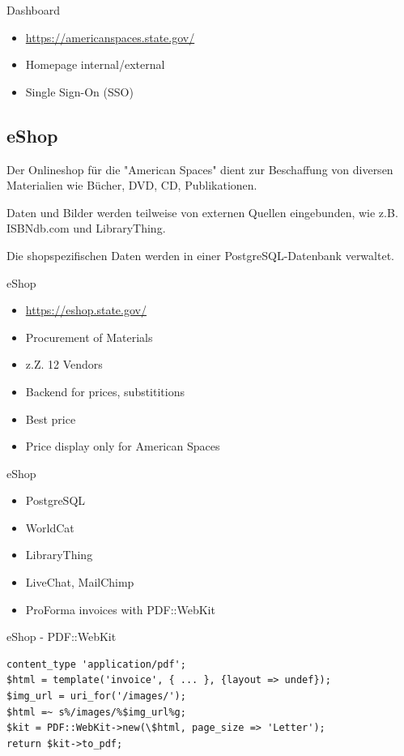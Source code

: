 \begin{frame}{Dashboard}
\begin{itemize}
\item \url{https://americanspaces.state.gov/}
\item Homepage internal/external
\item Single Sign-On (SSO)
\end{itemize}
\end{frame}
    
\subsection{eShop}

Der Onlineshop für die "American Spaces" dient zur Beschaffung von
diversen Materialien wie Bücher, DVD, CD, Publikationen.

Daten und Bilder werden teilweise von externen Quellen eingebunden,
wie z.B. ISBNdb.com und LibraryThing.

Die shopspezifischen Daten werden in einer PostgreSQL-Datenbank
verwaltet.

\begin{frame}{eShop}
\begin{itemize}
\item \url{https://eshop.state.gov/}
\item Procurement of Materials
\item z.Z. 12 Vendors
\item Backend for prices, substititions
\item Best price
\item Price display only for American Spaces
\end{itemize}
\end{frame}

\begin{frame}{eShop}
\begin{itemize}
\item PostgreSQL
\item WorldCat
\item LibraryThing
\item LiveChat, MailChimp
\item ProForma invoices with PDF::WebKit
\end{itemize}
\end{frame}
    
\begin{frame}[fragile]{eShop - PDF::WebKit}
\begin{lstlisting}
content_type 'application/pdf';
$html = template('invoice', { ... }, {layout => undef});
$img_url = uri_for('/images/');
$html =~ s%/images/%$img_url%g;
$kit = PDF::WebKit->new(\$html, page_size => 'Letter');
return $kit->to_pdf;
\end{lstlisting}
\end{frame}

